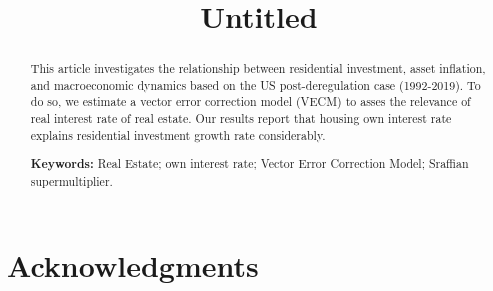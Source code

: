 %


\usepackage{epstopdf}%
\usepackage{graphicx}
\usepackage{multirow}
\usepackage{tablefootnote}
\usepackage{threeparttable}
\usepackage{booktabs}
\usepackage{float}

\usepackage[T1]{fontenc}
\usepackage[utf8]{inputenc}%
\usepackage[american]{babel}
\usepackage{setspace}
\usepackage{amssymb}
\usepackage{amsmath}%
\usepackage{mathptmx}%
\usepackage{url}
\usepackage{caption}
\usepackage{indentfirst}
\usepackage{csquotes}
\usepackage{lipsum}
\usepackage[titletoc,title]{appendix}

\usepackage{tikz}
\usetikzlibrary{through,calc}





\title{Untitled}


	
\maketitle

\begin{abstract}
	This article investigates the relationship between residential investment, asset inflation, and macroeconomic dynamics based on the US post-deregulation case (1992-2019).
	To do so, we estimate a vector error correction model (VECM) to asses the relevance of real interest rate of real estate. 
	Our results report that housing own interest
	rate explains residential investment growth rate considerably.
	
	\noindent\textbf{Keywords:} Real Estate; own interest rate; Vector Error Correction Model; Sraffian supermultiplier.
\end{abstract}









\section*{Acknowledgments}

